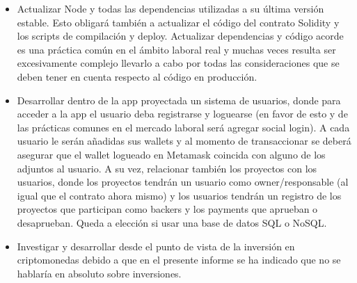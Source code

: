 \begin{itemize}
	\item Actualizar Node y todas las dependencias utilizadas a su última versión estable. Esto
	obligará también a actualizar el código del contrato Solidity y los scripts de compilación y
	deploy. Actualizar dependencias y código acorde es una práctica común en el ámbito laboral real
	y muchas veces resulta ser excesivamente complejo llevarlo a cabo por todas las consideraciones
	que	se deben tener en cuenta respecto al código en producción. 
	
	\item Desarrollar dentro de la app proyectada un sistema de usuarios, donde para acceder a la
	app el usuario deba registrarse y loguearse (en favor de esto y de las prácticas comunes en el
	mercado laboral será agregar social login). A cada usuario le serán añadidas sus wallets y al
	momento de transaccionar se deberá asegurar que el wallet logueado en Metamask coincida con
	alguno de los adjuntos al usuario. A su vez, relacionar también los proyectos con los usuarios,
	donde los proyectos tendrán un usuario como owner/responsable (al igual que el contrato ahora
	mismo) y los usuarios tendrán un registro de los proyectos que participan como backers y los
	payments que aprueban o desaprueban. Queda a elección si usar una base de datos SQL o NoSQL.
	
	\item Investigar y desarrollar desde el punto de vista de la inversión en criptomonedas debido
	a que en el presente informe se ha indicado que no se hablaría en absoluto sobre inversiones.

\end{itemize}
